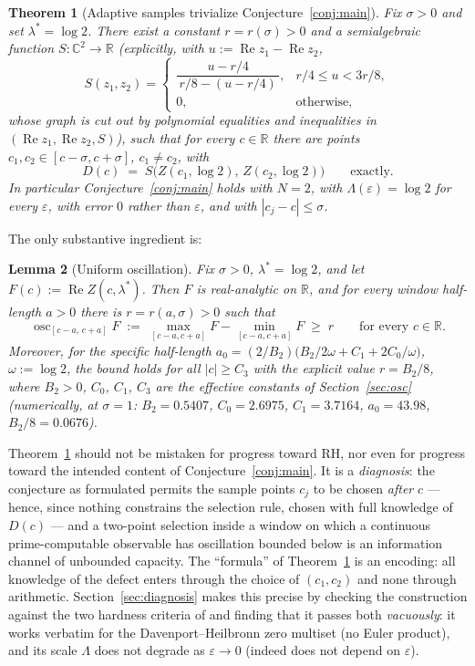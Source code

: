 \documentclass[11pt]{amsart}
\newtheorem{theorem}{Theorem}[section]
\newtheorem{lemma}[theorem]{Lemma}
\theoremstyle{definition}
\theoremstyle{remark}
\newcommand{\CC}{\mathbb{C}}
\newcommand{\RR}{\mathbb{R}}
\DeclareMathOperator{\Rre}{Re}
\DeclareMathOperator{\osc}{osc}
\begin{document}
\begin{theorem}[Adaptive samples trivialize Conjecture~\ref{conj:main}]\label{thm:main}
Fix $\sigma>0$ and set $\lambda^*=\log2$. There exist a constant $r=r(\sigma)>0$ and a semialgebraic function $S:\CC^2\to\RR$ (explicitly, with $u:=\Rre z_1-\Rre z_2$,
\[
S(z_1,z_2)=
\begin{cases}
\dfrac{u-r/4}{\,r/8-(u-r/4)\,}, & r/4\le u<3r/8,\\[4pt]
0,&\text{otherwise},
\end{cases}
\]
whose graph is cut out by polynomial equalities and inequalities in $(\Rre z_1,\Rre z_2,S)$), such that for every $c\in\RR$ there are points $c_1,c_2\in[c-\sigma,c+\sigma]$, $c_1\ne c_2$, with
\[
D(c)\;=\;S\big(Z(c_1,\log2),\,Z(c_2,\log2)\big)\qquad\text{exactly}.
\]
In particular Conjecture~\ref{conj:main} holds with $N=2$, with $\Lambda(\varepsilon)=\log2$ for every $\varepsilon$, with error $0$ rather than $\varepsilon$, and with $|c_j-c|\le\sigma$.
\end{theorem}

The only substantive ingredient is:

\begin{lemma}[Uniform oscillation]\label{lem:osc}
Fix $\sigma>0$, $\lambda^*=\log2$, and let $F(c):=\Rre Z(c,\lambda^*)$. Then $F$ is real-analytic on $\RR$, and for every window half-length $a>0$ there is $r=r(a,\sigma)>0$ such that
\[
\osc_{[c-a,\,c+a]}F\;:=\;\max_{[c-a,c+a]}F-\min_{[c-a,c+a]}F\;\ge\;r
\qquad\text{for every }c\in\RR.
\]
Moreover, for the specific half-length $a_0=(2/B_2)\big(B_2/2\omega+C_1+2C_0/\omega\big)$, $\omega:=\log2$, the bound holds for all $|c|\ge C_3$ with the explicit value $r=B_2/8$, where $B_2>0$, $C_0$, $C_1$, $C_3$ are the effective constants of Section~\ref{sec:osc} (numerically, at $\sigma=1$: $B_2=0.5407$, $C_0=2.6975$, $C_1=3.7164$, $a_0=43.98$, $B_2/8=0.0676$).
\end{lemma}

Theorem~\ref{thm:main} should not be mistaken for progress toward RH, nor even for progress toward the intended content of Conjecture~\ref{conj:main}. It is a \emph{diagnosis}: the conjecture as formulated permits the sample points $c_j$ to be chosen \emph{after} $c$ --- hence, since nothing constrains the selection rule, chosen with full knowledge of $D(c)$ --- and a two-point selection inside a window on which a continuous prime-computable observable has oscillation bounded below is an information channel of unbounded capacity. The ``formula'' of Theorem~\ref{thm:main} is an encoding: all knowledge of the defect enters through the choice of $(c_1,c_2)$ and none through arithmetic. Section~\ref{sec:diagnosis} makes this precise by checking the construction against the two hardness criteria of \cite[\S2]{SI} and finding that it passes both \emph{vacuously}: it works verbatim for the Davenport--Heilbronn zero multiset (no Euler product), and its scale $\Lambda$ does not degrade as $\varepsilon\to0$ (indeed does not depend on $\varepsilon$).
\end{document}
